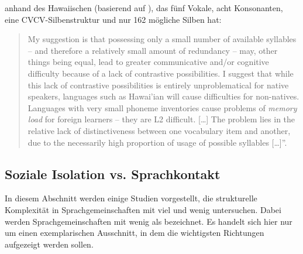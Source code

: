 \citet{Trudgill2011} anhand des Hawaiischen (basierend auf \citealt{Maddieson1984}), das fünf Vokale, acht Konsonanten, eine CVCV-Sil\-ben\-struk\-tur und nur 162 mögliche Silben hat:

\begin{quote}
My suggestion is that possessing only a small number of available syllables – and therefore a relatively small amount of redundancy – may, other things being equal, lead to greater communicative and/or cognitive difficulty because of a lack of contrastive possibilities. I suggest that while this lack of contrastive possibilities is entirely unproblematical for native speakers, languages such as Hawai’ian will cause difficulties for non-natives. Languages with very small phoneme inventories cause problems of \textit{memory load} for foreign learners – they are L2 difficult. […] The problem lies in the relative lack of distinctiveness between one vocabulary item and another, due to the necessarily high proportion of usage of possible syllables […]”. \citep[124]{Trudgill2011}
\end{quote}

\subsection{Soziale Isolation vs. Sprachkontakt}\label{2.2.3}

In diesem Abschnitt werden einige Studien vorgestellt, die strukturelle Komplexität in Sprachgemeinschaften mit viel und wenig  untersuchen. Dabei werden Sprachgemeinschaften mit wenig  als  bezeichnet. Es handelt sich hier nur um einen exemplarischen Ausschnitt, in dem die wichtigsten Richtungen aufgezeigt werden sollen.

